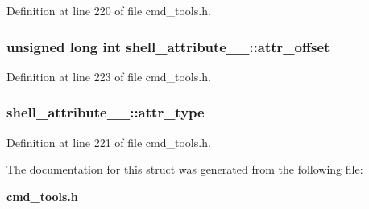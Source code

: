 Definition at line 220 of file cmd\_\-tools.h.
\subsubsection[{attr\_\-offset}]{\setlength{\rightskip}{0pt plus 5cm}unsigned long int {\bf shell\_\-attribute\_\-\_\-::attr\_\-offset}}\label{structshell__attribute_____a4c8737502cb8a3036839f61402199d3d}


Definition at line 223 of file cmd\_\-tools.h.
\subsubsection[{attr\_\-type}]{ {\bf shell\_\-attribute\_\-\_\-::attr\_\-type}}\label{structshell__attribute_____a12dbb5c64119c94cb7d50ed027233601}


Definition at line 221 of file cmd\_\-tools.h.

The documentation for this struct was generated from the following file:\begin{DoxyCompactItemize}
\item 
{\bf cmd\_\-tools.h}\end{DoxyCompactItemize}
